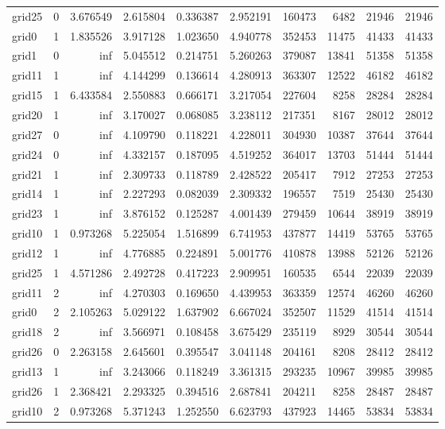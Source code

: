 \begin{longtable}{|l|r|r|r|r|r|r|r|r|r|}
grid25 & 0 & 3.676549 & 2.615804 & 0.336387 & 2.952191 & 160473 & 6482 & 21946 & 21946 \\
grid0 & 1 & 1.835526 & 3.917128 & 1.023650 & 4.940778 & 352453 & 11475 & 41433 & 41433 \\
grid1 & 0 & inf & 5.045512 & 0.214751 & 5.260263 & 379087 & 13841 & 51358 & 51358 \\
grid11 & 1 & inf & 4.144299 & 0.136614 & 4.280913 & 363307 & 12522 & 46182 & 46182 \\
grid15 & 1 & 6.433584 & 2.550883 & 0.666171 & 3.217054 & 227604 & 8258 & 28284 & 28284 \\
grid20 & 1 & inf & 3.170027 & 0.068085 & 3.238112 & 217351 & 8167 & 28012 & 28012 \\
grid27 & 0 & inf & 4.109790 & 0.118221 & 4.228011 & 304930 & 10387 & 37644 & 37644 \\
grid24 & 0 & inf & 4.332157 & 0.187095 & 4.519252 & 364017 & 13703 & 51444 & 51444 \\
grid21 & 1 & inf & 2.309733 & 0.118789 & 2.428522 & 205417 & 7912 & 27253 & 27253 \\
grid14 & 1 & inf & 2.227293 & 0.082039 & 2.309332 & 196557 & 7519 & 25430 & 25430 \\
grid23 & 1 & inf & 3.876152 & 0.125287 & 4.001439 & 279459 & 10644 & 38919 & 38919 \\
grid10 & 1 & 0.973268 & 5.225054 & 1.516899 & 6.741953 & 437877 & 14419 & 53765 & 53765 \\
grid12 & 1 & inf & 4.776885 & 0.224891 & 5.001776 & 410878 & 13988 & 52126 & 52126 \\
grid25 & 1 & 4.571286 & 2.492728 & 0.417223 & 2.909951 & 160535 & 6544 & 22039 & 22039 \\
grid11 & 2 & inf & 4.270303 & 0.169650 & 4.439953 & 363359 & 12574 & 46260 & 46260 \\
grid0 & 2 & 2.105263 & 5.029122 & 1.637902 & 6.667024 & 352507 & 11529 & 41514 & 41514 \\
grid18 & 2 & inf & 3.566971 & 0.108458 & 3.675429 & 235119 & 8929 & 30544 & 30544 \\
grid26 & 0 & 2.263158 & 2.645601 & 0.395547 & 3.041148 & 204161 & 8208 & 28412 & 28412 \\
grid13 & 1 & inf & 3.243066 & 0.118249 & 3.361315 & 293235 & 10967 & 39985 & 39985 \\
grid26 & 1 & 2.368421 & 2.293325 & 0.394516 & 2.687841 & 204211 & 8258 & 28487 & 28487 \\
grid10 & 2 & 0.973268 & 5.371243 & 1.252550 & 6.623793 & 437923 & 14465 & 53834 & 53834 \\

\end{longtable}
